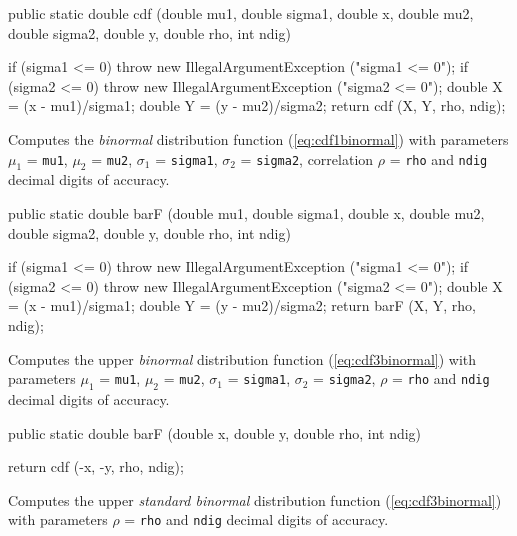\begin{code}

   public static double cdf (double mu1, double sigma1, double x, 
                             double mu2, double sigma2, double y,
                             double rho, int ndig) \begin{hide} {
      if (sigma1 <= 0)
         throw new IllegalArgumentException ("sigma1 <= 0");
      if (sigma2 <= 0)
         throw new IllegalArgumentException ("sigma2 <= 0");
      double X = (x - mu1)/sigma1;
      double Y = (y - mu2)/sigma2;
      return cdf (X, Y, rho, ndig);
   }\end{hide}
\end{code}
\begin{tabb} Computes the {\em binormal\/} distribution function 
   (\ref{eq:cdf1binormal}) with parameters $\mu_1$ = \texttt{mu1},
 $\mu_2$ = \texttt{mu2}, $\sigma_1$ = \texttt{sigma1},  $\sigma_2$ = \texttt{sigma2},
 correlation $\rho$ = \texttt{rho} and \texttt{ndig} decimal digits of accuracy.
\end{tabb}
\begin{code}

   public static double barF (double mu1, double sigma1, double x, 
                              double mu2, double sigma2, double y,
                              double rho, int ndig) \begin{hide} {
      if (sigma1 <= 0)
         throw new IllegalArgumentException ("sigma1 <= 0");
      if (sigma2 <= 0)
         throw new IllegalArgumentException ("sigma2 <= 0");
      double X = (x - mu1)/sigma1;
      double Y = (y - mu2)/sigma2;
      return barF (X, Y, rho, ndig);
   }\end{hide}
\end{code}
\begin{tabb} Computes the upper {\em binormal\/} distribution function
    (\ref{eq:cdf3binormal})  with parameters $\mu_1$ = \texttt{mu1},
 $\mu_2$ = \texttt{mu2}, $\sigma_1$ = \texttt{sigma1},  $\sigma_2$ = \texttt{sigma2},
 $\rho$ = \texttt{rho} and \texttt{ndig} decimal digits of accuracy.
\end{tabb}
\begin{code}

   public static double barF (double x, double y, double rho, int ndig) \begin{hide}  {
      return cdf (-x, -y, rho, ndig);
   }\end{hide}
\end{code}
\begin{tabb} Computes the upper {\em standard binormal\/} distribution function
    (\ref{eq:cdf3binormal})  with parameters $\rho$ = \texttt{rho} and 
   \texttt{ndig} decimal digits of accuracy.
\end{tabb}
